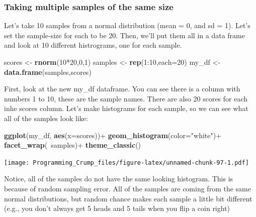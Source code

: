 \documentclass[]{book}
\newenvironment{Shaded}{\begin{snugshade}}{\end{snugshade}}
\newcommand{\KeywordTok}[1]{\textcolor[rgb]{0.13,0.29,0.53}{\textbf{{#1}}}}
\newcommand{\DataTypeTok}[1]{\textcolor[rgb]{0.13,0.29,0.53}{{#1}}}
\newcommand{\DecValTok}[1]{\textcolor[rgb]{0.00,0.00,0.81}{{#1}}}
\newcommand{\StringTok}[1]{\textcolor[rgb]{0.31,0.60,0.02}{{#1}}}
\newcommand{\NormalTok}[1]{{#1}}
\theoremstyle{definition}
\theoremstyle{definition}
\theoremstyle{definition}
\theoremstyle{remark}
\begin{document}
\subsubsection{Taking multiple samples of the same
size}\label{taking-multiple-samples-of-the-same-size}

Let's take 10 samples from a normal distribution (mean = 0, and sd = 1).
Let's set the sample-size for each to be 20. Then, we'll put them all in
a data frame and look at 10 different histrograms, one for each sample.

\begin{Shaded}
\begin{Highlighting}[]
\NormalTok{scores <-}\StringTok{ }\KeywordTok{rnorm}\NormalTok{(}\DecValTok{10}\NormalTok{*}\DecValTok{20}\NormalTok{,}\DecValTok{0}\NormalTok{,}\DecValTok{1}\NormalTok{)}
\NormalTok{samples <-}\StringTok{ }\KeywordTok{rep}\NormalTok{(}\DecValTok{1}\NormalTok{:}\DecValTok{10}\NormalTok{,}\DataTypeTok{each=}\DecValTok{20}\NormalTok{)}
\NormalTok{my_df <-}\StringTok{ }\KeywordTok{data.frame}\NormalTok{(samples,scores)}
\end{Highlighting}
\end{Shaded}

First, look at the new my\_df dataframe. You can see there is a column
with numbers 1 to 10, these are the sample names. There are also 20
scores for each inhe scores column. Let's make histograms for each
sample, so we can see what all of the samples look like:

\begin{Shaded}
\begin{Highlighting}[]
\KeywordTok{ggplot}\NormalTok{(my_df, }\KeywordTok{aes}\NormalTok{(}\DataTypeTok{x=}\NormalTok{scores))+}
\StringTok{  }\KeywordTok{geom_histogram}\NormalTok{(}\DataTypeTok{color=}\StringTok{"white"}\NormalTok{)+}
\StringTok{  }\KeywordTok{facet_wrap}\NormalTok{(~samples)+}
\StringTok{  }\KeywordTok{theme_classic}\NormalTok{()}
\end{Highlighting}
\end{Shaded}

\texttt{[image: Programming\_Crump\_files/figure-latex/unnamed-chunk-97-1.pdf]}

Notice, all of the samples do not have the same looking histogram. This
is because of random sampling error. All of the samples are coming from
the same normal distributions, but random chance makes each sample a
little bit different (e.g., you don't always get 5 heads and 5 tails
when you flip a coin right)
\end{document}

